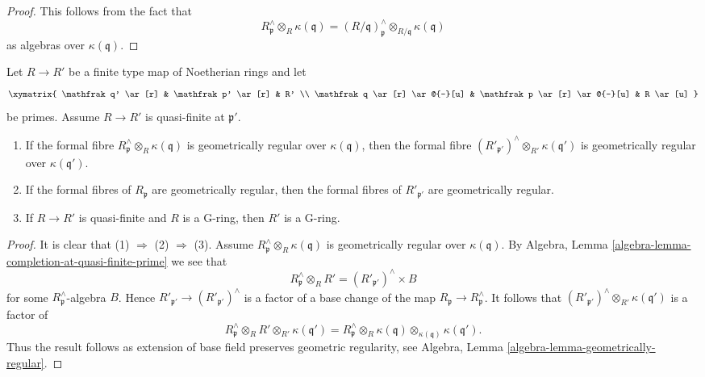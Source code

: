 \begin{proof}
This follows from the fact that
$$
R_\mathfrak p^\wedge \otimes_R \kappa(\mathfrak q) =
(R/\mathfrak q)_\mathfrak p^\wedge \otimes_{R/\mathfrak q} \kappa(\mathfrak q)
$$
as algebras over $\kappa(\mathfrak q)$.
\end{proof}

\begin{lemma}
\label{lemma-G-ring-goes-up-quasi-finite}
Let $R \to R'$ be a finite type map of Noetherian rings and let
$$
\xymatrix{
\mathfrak q' \ar[r] & \mathfrak p' \ar[r] & R' \\
\mathfrak q \ar[r] \ar@{-}[u] &
\mathfrak p \ar[r] \ar@{-}[u] & R \ar[u]
}
$$
be primes. Assume $R \to R'$ is quasi-finite at $\mathfrak p'$.
\begin{enumerate}
\item If the formal fibre $R_\mathfrak p^\wedge \otimes_R \kappa(\mathfrak q)$
is geometrically regular over $\kappa(\mathfrak q)$, then the formal fibre
$(R'_{\mathfrak p'})^\wedge \otimes_{R'} \kappa(\mathfrak q')$
is geometrically regular over $\kappa(\mathfrak q')$.
\item If the formal fibres of $R_\mathfrak p$ are geometrically regular,
then the formal fibres of $R'_{\mathfrak p'}$ are geometrically regular.
\item If $R \to R'$ is quasi-finite and $R$ is a G-ring, then $R'$ is
a G-ring.
\end{enumerate}
\end{lemma}

\begin{proof}
It is clear that (1) $\Rightarrow$ (2) $\Rightarrow$ (3).
Assume $R_\mathfrak p^\wedge \otimes_R \kappa(\mathfrak q)$
is geometrically regular over $\kappa(\mathfrak q)$.
By Algebra, Lemma \ref{algebra-lemma-completion-at-quasi-finite-prime}
we see that
$$
R_\mathfrak p^\wedge \otimes_R R'
=
(R'_{\mathfrak p'})^\wedge \times B
$$
for some $R_\mathfrak p^\wedge$-algebra $B$. Hence
$R'_{\mathfrak p'} \to (R'_{\mathfrak p'})^\wedge$ is a factor of
a base change of the map $R_\mathfrak p \to R_\mathfrak p^\wedge$.
It follows that $(R'_{\mathfrak p'})^\wedge \otimes_{R'} \kappa(\mathfrak q')$
is a factor of
$$
R_\mathfrak p^\wedge \otimes_R R' \otimes_{R'} \kappa(\mathfrak q') =
R_\mathfrak p^\wedge \otimes_R \kappa(\mathfrak q)
\otimes_{\kappa(\mathfrak q)} \kappa(\mathfrak q').
$$
Thus the result follows as extension of base field preserves
geometric regularity, see
Algebra, Lemma \ref{algebra-lemma-geometrically-regular}.
\end{proof}

